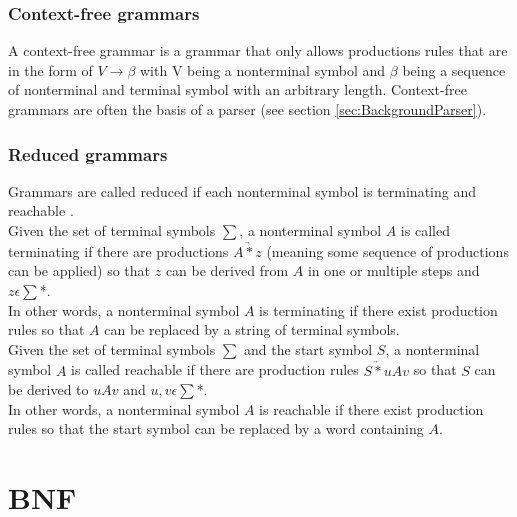 \subsubsection{Context-free grammars}

A context-free grammar is a grammar that only allows productions rules that are in the form of $V \rightarrow \beta$ with V being a nonterminal symbol and $\beta$ being a sequence of nonterminal and terminal symbol with an arbitrary length.
Context-free grammars are often the basis of a parser (see section \ref{sec:BackgroundParser}). \cite{AutomataTheory.2007}

\subsubsection{Reduced grammars}

Grammars are called reduced if each nonterminal symbol is terminating and reachable \cite{Cremers75}.\\
Given the set of terminal symbols $\sum$, a nonterminal symbol $A$ is called terminating if there are productions $A \underrightarrow{*} z$ (meaning some sequence of productions can be applied) so that $z$ can be derived from $A$ in one or multiple steps and $z \epsilon \sum$*.\\
In other words, a nonterminal symbol $A$ is terminating if there exist production rules so that  $A$ can be replaced by a string of terminal symbols. \cite{Cremers75}\\
Given the set of terminal symbols $\sum$ and the start symbol $S$, a nonterminal symbol $A$ is called reachable if there are production rules $S \underrightarrow{*} uAv$ so that $S$ can be derived to $uAv$ and $u,v \epsilon \sum$*.\\
In other words, a nonterminal symbol $A$ is reachable if there exist production rules so that the start symbol can be replaced by a word containing $A$. \cite{Cremers75}


\section{\acf{BNF}}\label{sec:BackgroundBNF}

